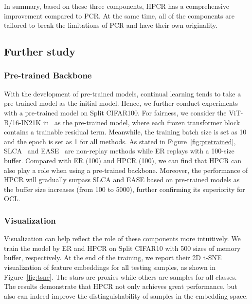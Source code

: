 In summary, based on these three components, HPCR has a comprehensive improvement compared to PCR. At the same time, all of the components are tailored to break the limitations of PCR and have their own originality.


 

\subsection{Further study}

\subsubsection{Pre-trained Backbone} With the development of pre-trained models, continual learning tends to take a pre-trained model as the initial model. Hence, we further conduct experiments with a pre-trained model on Split CIFAR100. For fairness, we consider the ViT-B/16-IN21K in~\cite{zhou2024expandable} as the pre-trained model, where each frozen transformer block contains a trainable residual term. Meanwhile, the training batch size is set as 10 and the epoch is set as 1 for all methods. As stated in Figure~\ref{fig:pretrained}, SLCA~\cite{zhang2023slca} and EASE~\cite{zhou2024expandable} are non-replay methods while ER replays with a 100-size buffer. Compared with ER (100) and HPCR (100), we can find that HPCR can also play a role when using a pre-trained backbone. Moreover, the performance of HPCR will gradually surpass SLCA and EASE based on pre-trained models as the buffer size increases (from 100 to 5000), further confirming its superiority for OCL.

\subsubsection{Visualization} Visualization can
help reflect the role of these components more intuitively. We train the model by ER and HPCR on Split CIFAR10 with 500 sizes of memory buffer, respectively. At the end of the training, we report their 2D t-SNE~\cite{van2008visualizing} visualization of feature embeddings for all testing samples, as shown in Figure~\ref{fig:tsne}. The stars are proxies while others are samples for all classes. The results demonstrate that HPCR not only achieves great performance, but also can indeed improve the distinguishability of samples in the embedding space.



